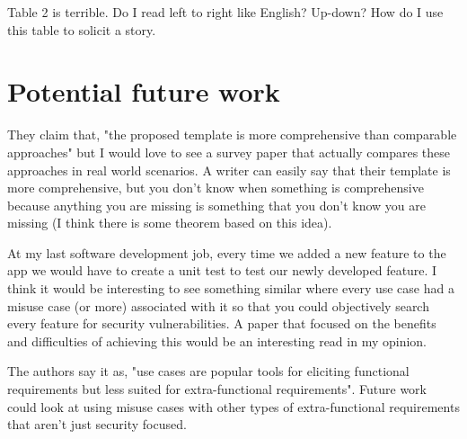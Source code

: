 \documentclass[11pt,twoside]{srcreprt}
\begin{document}
Table 2 is terrible. Do I read left to right like English? Up-down? How do I use this table to solicit a story.

\section{Potential future work}
They claim that, "the proposed template is more comprehensive than comparable approaches" but I would love to see a survey paper that actually compares these approaches in real world scenarios. A writer can easily say that their template is more comprehensive, but you don't know when something is comprehensive because anything you are missing is something that you don't know you are missing (I think there is some theorem based on this idea).

At my last software development job, every time we added a new feature to the app we would have to create a unit test to test our newly developed feature. I think it would be interesting to see something similar where every use case had a misuse case (or more) associated with it so that you could objectively search every feature for security vulnerabilities. A paper that focused on the benefits and difficulties of achieving this would be an interesting read in my opinion.

The authors say it as, "use cases are popular tools for eliciting functional requirements but less suited for extra-functional requirements". Future work could look at using misuse cases with other types of extra-functional requirements that aren't just security focused.
\end{document}

